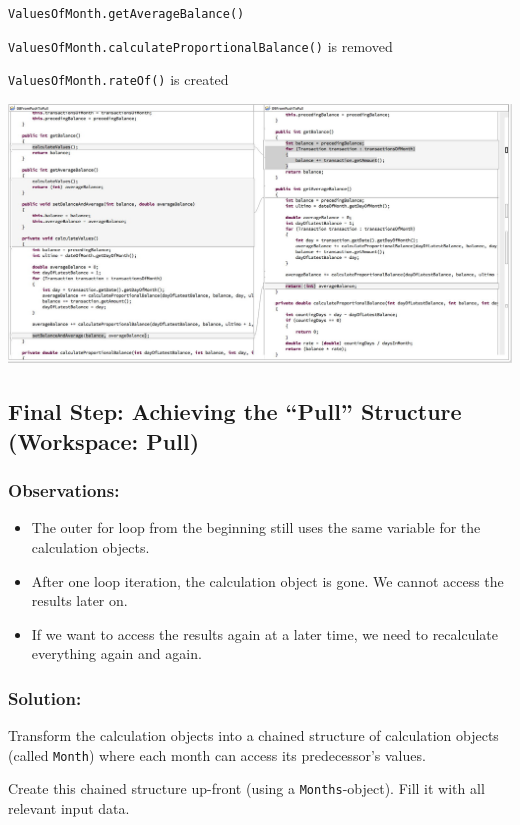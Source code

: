 \documentclass[a4paper,fleqn,titlepage,11pt]{article}
\begin{document}
\texttt{ValuesOfMonth.getAverageBalance()}

\texttt{ValuesOfMonth.calculateProportionalBalance()} is removed

\texttt{ValuesOfMonth.rateOf()} is created

\includegraphics[width=1\textwidth]{CompareViews/08-09.jpg}


\subsection*{Final Step: Achieving the ``Pull'' Structure (Workspace: Pull)}

\subsubsection*{Observations:}

\begin{itemize}
\item The outer for loop from the beginning still uses the same variable for the calculation objects.
\item After one loop iteration, the calculation object is gone. We cannot access the results later on.
\item If we want to access the results again at a later time, we need to recalculate everything again and again.
\end{itemize}

\subsubsection*{Solution:}

Transform the calculation objects into a chained structure of calculation objects (called \texttt{Month}) where each month can access its predecessor's values.

Create this chained structure up-front (using a \texttt{Months}-object). Fill it with all relevant input data.
\end{document}
